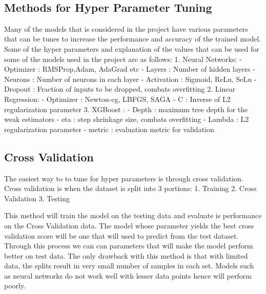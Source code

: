 \documentclass[11pt]{article}
\begin{document}
    \begin{center}
    \end{center}
    { \hspace*{\fill} \\}
    
    \hypertarget{methods-for-hyper-parameter-tuning}{%
\subsection{Methods for Hyper Parameter
Tuning}\label{methods-for-hyper-parameter-tuning}}

Many of the models that is considered in the project have various
parameters that can be tunes to increase the performance and accuracy of
the trained model. Some of the hyper parameters and explanation of the
values that can be used for some of the models used in the project are
as follows: 1. Neural Networks: - Optimizer : RMSProp,Adam, AdaGrad etc
- Layers : Number of hidden layers - Neurons : Number of neurons in each
layer - Activation : Sigmoid, ReLu, SeLu - Dropout : Fraction of inputs
to be dropped, combats overfitting 2. Linear Regression: - Optimizer :
Newton-cg, LBFGS, SAGA - C : Inverse of L2 regularization parameter 3.
XGBoost : - Depth : maximum tree depth for the weak estimators - eta :
step shrinkage size, combats overfitting - Lambda : L2 regularization
parameter - metric : evaluation metric for validation

    \hypertarget{cross-validation}{%
\subsection{Cross Validation}\label{cross-validation}}

The easiest way to to tune for hyper parameters is through cross
validation. Cross validation is when the dataset is split into 3
portions: 1. Training 2. Cross Validation 3. Testing

This method will train the model on the testing data and evaluate is
performance on the Cross Validation data. The model whose parameter
yields the best cross validation score will be one that will used to
predict from the test dataset. Through this process we can can
parameters that will make the model perform better on test data. The
only drawback with this method is that with limited data, the splits
result in very small number of samples in each set. Models such as
neural networks do not work well with lesser data points hence will
perform poorly.
\end{document}
